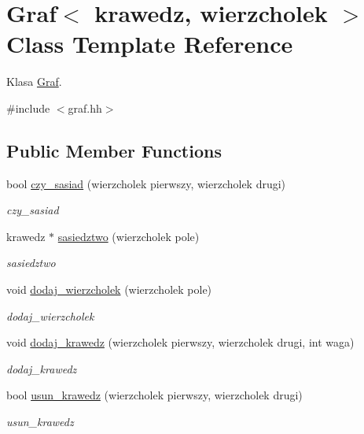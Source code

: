 \hypertarget{class_graf}{\section{Graf$<$ krawedz, wierzcholek $>$ Class Template Reference}
\label{class_graf}
}


Klasa \hyperlink{class_graf}{Graf}.  




{\ttfamily \#include $<$graf.\+hh$>$}

\subsection*{Public Member Functions}
\begin{DoxyCompactItemize}
\item 
bool \hyperlink{class_graf_aedd9dc4bb2be26426609805ad2e1f12b}{czy\+\_\+sasiad} (wierzcholek pierwszy, wierzcholek drugi)
\begin{DoxyCompactList}\small\item\em czy\+\_\+sasiad \end{DoxyCompactList}\item 
krawedz $\ast$ \hyperlink{class_graf_aa79b7d3bec96534f43fe363d75235b44}{sasiedztwo} (wierzcholek pole)
\begin{DoxyCompactList}\small\item\em sasiedztwo \end{DoxyCompactList}\item 
void \hyperlink{class_graf_a1fee5055ad6af6078d5a0b0f623a8b5e}{dodaj\+\_\+wierzcholek} (wierzcholek pole)
\begin{DoxyCompactList}\small\item\em dodaj\+\_\+wierzcholek \end{DoxyCompactList}\item 
void \hyperlink{class_graf_ae25fb0ebec90550f883029f3f8ec010a}{dodaj\+\_\+krawedz} (wierzcholek pierwszy, wierzcholek drugi, int waga)
\begin{DoxyCompactList}\small\item\em dodaj\+\_\+krawedz \end{DoxyCompactList}\item 
bool \hyperlink{class_graf_adbfdf992968717175944d844e929d3b8}{usun\+\_\+krawedz} (wierzcholek pierwszy, wierzcholek drugi)
\begin{DoxyCompactList}\small\item\em usun\+\_\+krawedz \end{DoxyCompactList}\item 

\end{DoxyCompactItemize}
